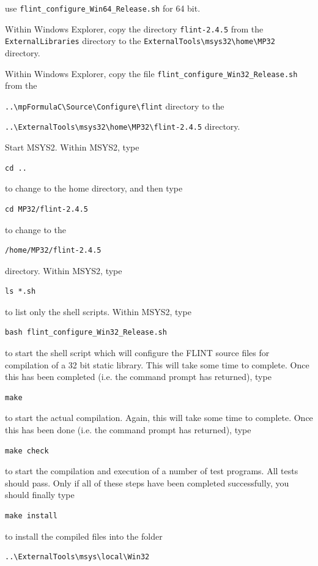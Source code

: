 use \verb|flint_configure_Win64_Release.sh| for 64 bit.

\vpara
Within Windows Explorer, copy the directory \verb|flint-2.4.5|  from the \verb|ExternalLibraries|
directory to the \verb|ExternalTools\msys32\home\MP32| directory. 

\vpara
Within Windows Explorer, copy the file \verb|flint_configure_Win32_Release.sh|  from the

\verb|..\mpFormulaC\Source\Configure\flint| directory to the 

\verb|..\ExternalTools\msys32\home\MP32\flint-2.4.5| directory.  


\vpara
Start MSYS2. Within MSYS2, type
\begin{verbatim}
cd ..
\end{verbatim}
to change to the home directory, and then type 
\begin{verbatim}
cd MP32/flint-2.4.5
\end{verbatim}
to change to the
\begin{verbatim}
/home/MP32/flint-2.4.5
\end{verbatim}
directory. Within MSYS2, type
\begin{verbatim}
ls *.sh
\end{verbatim}
to list only the shell scripts. Within MSYS2, type
\begin{verbatim}
bash flint_configure_Win32_Release.sh
\end{verbatim}
to start the shell script which will configure the FLINT source files for compilation of a 32 bit static library. This will take some time to complete. Once this has been completed (i.e. the command prompt has returned), type
\begin{verbatim}
make
\end{verbatim}
to start the actual compilation. Again, this will take some time to complete. Once this has been done (i.e. the command prompt has returned), type
\begin{verbatim}
make check
\end{verbatim}
to start the compilation and execution of a number of test programs. All tests should pass. Only if all of these steps have been completed successfully, you should finally type
\begin{verbatim}
make install
\end{verbatim}
to install the compiled files into the folder
\begin{verbatim}
..\ExternalTools\msys\local\Win32
\end{verbatim}



